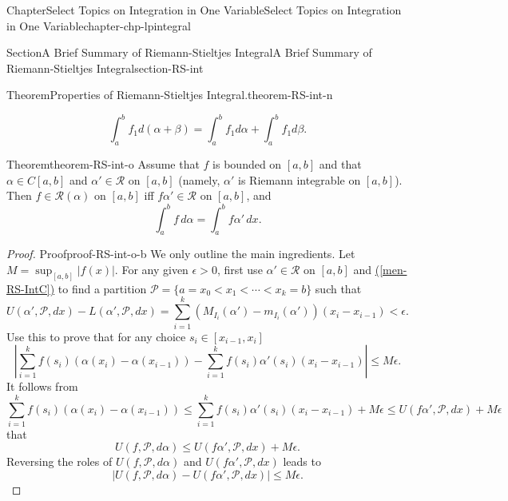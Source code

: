 \documentclass[oneside,10pt,]{book}
\newcommand{\xreffont}{\relax}
\numberwithin{equation}{section}
\newcommand{\cP}{\mathcal{P}}
\newcommand{\cR}{\mathcal{R}}
\begin{document}
\begin{chapterptx}{Chapter}{Select Topics on Integration in One Variable}{}{Select Topics on Integration in One Variable}{}{}{chapter-chp-lpintegral}
\begin{sectionptx}{Section}{A Brief Summary of Riemann-Stieltjes Integral}{}{A Brief Summary of Riemann-Stieltjes Integral}{}{}{section-RS-int}
\begin{theorem}{Theorem}{Properties of Riemann-Stieltjes Integral.}{}{theorem-RS-int-n}
\begin{enumerate}[label=(\alph*)]
\begin{equation*}
\int_{a}^{b} f_{1} d(\alpha+\beta) = \int_{a}^{b} f_{1} d\alpha + \int_{a}^{b} f_{1} d\beta.
\end{equation*}
%
\end{enumerate}
\end{theorem}
\begin{theorem}{Theorem}{}{}{theorem-RS-int-o}%
Assume that \(f\) is bounded on \([a, b]\) and that \(\alpha \in C[a, b]\) and \(\alpha' \in \cR\) on \([a, b]\) (namely, \(\alpha'\) is Riemann integrable on \([a, b]\)). Then \(f\in \cR(\alpha)\) on \([a, b]\) iff \(f\alpha' \in \cR\) on \([a, b]\), and%
\begin{equation}
\int_{a}^{b} f\, d\alpha = \int_{a}^{b} f \alpha'\, dx.\label{men-int-rseval}
\end{equation}
\end{theorem}
\begin{proof}{Proof}{}{proof-RS-int-o-b}
We only outline the main ingredients.  Let \(M=\sup_{[a, b]}|f(x)|\). For any given \(\epsilon > 0\), first use \(\alpha' \in \cR\) on \([a, b]\)  and \hyperref[men-RS-IntC]{({\xreffont\ref{men-RS-IntC}})} to find a partition \(\cP=\{a=x_{0} < x_{1} < \cdots < x_{k}=b\}\) such that%
\begin{equation}
U(\alpha', \cP, dx) - L(\alpha', \cP, dx) 
=\sum_{i=1}^{k}\left( M_{I_{i}} (\alpha') -m_{I_{i}} (\alpha')\right) (x_{i}-x_{i-1}) < \epsilon.\label{men-pf-rs1}
\end{equation}
Use this to prove that for any choice \(s_{i}\in [x_{i-1}, x_{i}]\)%
\begin{equation}
\left| \sum_{i=1}^{k} f(s_{i}) (\alpha (x_{i})-\alpha (x_{i-1})) -
\sum_{i=1}^{k} f(s_{i}) \alpha'(s_{i})(x_{i}-x_{i-1})\right| \le M\epsilon.\label{men-pf-rs2}
\end{equation}
It follows from%
\begin{equation*}
\sum_{i=1}^{k} f(s_{i}) (\alpha (x_{i})-\alpha (x_{i-1})) \le 
\sum_{i=1}^{k} f(s_{i}) \alpha'(s_{i})(x_{i}-x_{i-1}) + M\epsilon
\le U(f \alpha', \cP, dx) +M\epsilon
\end{equation*}
that%
\begin{equation*}
U(f, \cP, d\alpha) \le U(f \alpha', \cP, dx) +M\epsilon.
\end{equation*}
Reversing the roles of \(U(f, \cP, d\alpha)\) and \(U(f \alpha', \cP, dx)\) leads to%
\begin{equation}
\left| U(f, \cP, d\alpha) - U(f \alpha', \cP, dx) \right| \le M\epsilon.\label{men-pf-rs2b}
\end{equation}

\end{proof}
\end{sectionptx}
\end{chapterptx}
\end{document}
